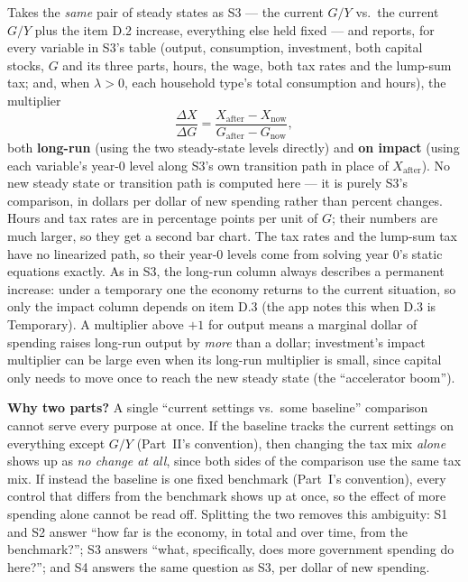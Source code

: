 \documentclass[11pt]{article}
\newcommand{\eq}[1]{\begin{equation}#1\end{equation}}
\begin{document}
Takes the \emph{same} pair of steady states as S3 --- the current $G/Y$
vs.\ the current $G/Y$ plus the item D.2 increase, everything else held
fixed --- and reports, for every variable in S3's table (output, consumption,
investment, both capital stocks, $G$ and its three parts, hours, the wage,
both tax rates and the lump-sum tax; and, when $\lambda>0$, each household
type's total consumption and hours), the multiplier
\eq{ \frac{\Delta X}{\Delta G} = \frac{X_{\text{after}}-X_{\text{now}}}{G_{\text{after}}-G_{\text{now}}}, }
both \textbf{long-run} (using the two steady-state levels directly) and
\textbf{on impact} (using each variable's year-0 level along S3's own
transition path in place of $X_{\text{after}}$). No new steady state or
transition path is computed here --- it is purely S3's comparison, in
dollars per dollar of new spending rather than percent changes. Hours and
tax rates are in percentage points per unit of $G$; their numbers are much
larger, so they get a second bar chart. The tax rates and the lump-sum tax
have no linearized path, so their year-0 levels come from solving year 0's
static equations exactly. As in S3, the long-run column always describes a
permanent increase: under a temporary one the economy returns to the
current situation, so only the impact column depends on item D.3 (the app
notes this when D.3 is Temporary). A
multiplier above $+1$ for output means a marginal dollar of spending
raises long-run output by \emph{more} than a dollar;
investment's impact multiplier can be large even when its long-run
multiplier is small, since capital only needs to move once to reach the
new steady state (the ``accelerator boom'').

\begin{notebox}
\textbf{Why two parts?} A single ``current settings vs.\ some baseline''
comparison cannot serve every purpose at once. If the baseline tracks the
current settings on everything except $G/Y$ (Part~II's convention), then
changing the tax mix \emph{alone} shows up as \emph{no change at all},
since both sides of the comparison use the same tax mix. If instead the
baseline is one fixed benchmark (Part~I's convention), every control that
differs from the benchmark shows up at once, so the effect of more
spending alone cannot be read off. Splitting the two removes this
ambiguity: S1 and S2 answer ``how far is the economy, in total and over
time, from the benchmark?''; S3 answers ``what, specifically, does more
government spending do here?''; and S4 answers the same question as S3,
per dollar of new spending.
\end{notebox}
\end{document}
